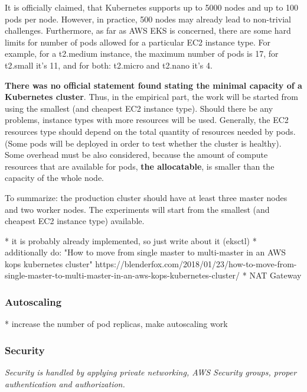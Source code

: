 It is officially claimed, that Kubernetes supports up to 5000 nodes and up to 100 pods per node\cite{kubernetes-node-size}\cite{kubernetes-large}. However, in practice, 500 nodes may already lead to non-trivial challenges. Furthermore, as far as AWS EKS is concerned, there are some hard limits for number of pods allowed for a particular EC2 instance type. For example, for a t2.medium instance, the maximum number of pods is 17, for t2.small it's 11, and for both: t2.micro and t2.nano it's 4\cite{kubernetes-node-size}\cite{eks-hard-limits}.

\textbf{There was no official statement found stating the minimal capacity of a Kubernetes cluster}. Thus, in the empirical part, the work will be started from using the smallest (and cheapest EC2 instance type). Should there be any problems, instance types with more resources will be used. Generally, the EC2 resources type should depend on the total quantity of resources needed by pods. (Some pods will be deployed in order to test whether the cluster is healthy). Some overhead must be also considered, because the amount of compute resources that are available for pods, \textbf{the allocatable}, is smaller than the capacity of the whole node\cite{k8s-alloc}.

To summarize: the production cluster should have at least three master nodes and two worker nodes. The experiments will start from the smallest (and cheapest EC2 instance type) available.

* it is probably already implemented, so just write about it (eksctl)
* additionally do: "How to move from single master to multi-master in an AWS kops kubernetes cluster" https://blenderfox.com/2018/01/23/how-to-move-from-single-master-to-multi-master-in-an-aws-kops-kubernetes-cluster/
* NAT Gateway

\subsubsection{Autoscaling}

* increase the number of pod replicas, make autoscaling work

\subsubsection{Security}
\textit{Security is handled by applying private networking, AWS Security groups, proper authentication and authorization.}
\\

